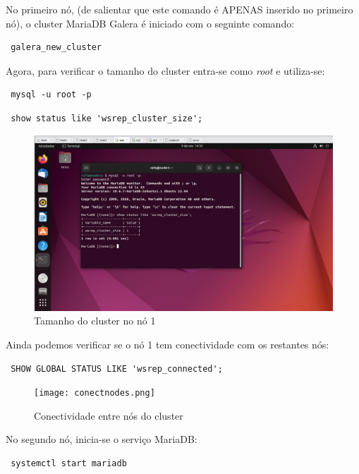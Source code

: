 No primeiro nó, (de salientar que este comando é APENAS inserido no primeiro nó), o cluster MariaDB Galera é iniciado com o seguinte comando:

\begin{verbatim} galera_new_cluster \end{verbatim}

Agora, para verificar o tamanho do cluster entra-se como \textit{root} e utiliza-se:

\begin{verbatim} mysql -u root -p \end{verbatim}

\begin{verbatim} show status like 'wsrep_cluster_size'; \end{verbatim}

\begin{figure}[H]
\center
\includegraphics[width=13cm]{imagens/Screenshot_66.png}
\caption{Tamanho do cluster no nó 1}
\end{figure}

Ainda podemos verificar se o nó 1 tem conectividade com os restantes nós:

\begin{verbatim} SHOW GLOBAL STATUS LIKE 'wsrep_connected'; \end{verbatim}

\begin{figure}[H]
\center
\texttt{[image: conectnodes.png]}
\caption{Conectividade entre nós do cluster}
\end{figure}

No segundo nó, inicia-se o serviço MariaDB:

\begin{verbatim} systemctl start mariadb \end{verbatim}

